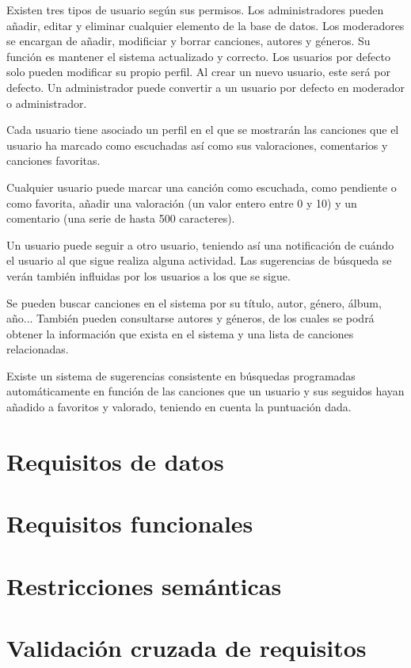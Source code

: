 \documentclass[11pt,a4paper]{article}
\begin{document}
Existen tres tipos de usuario según sus permisos. Los administradores pueden añadir, editar y eliminar cualquier elemento de la base de datos. Los moderadores se encargan de añadir, modificiar y borrar canciones, autores y géneros. Su función es mantener el sistema actualizado y correcto. Los usuarios por defecto solo pueden modificar su propio perfil. Al crear un nuevo usuario, este será por defecto. Un administrador puede convertir a un usuario por defecto en moderador o administrador.

Cada usuario tiene asociado un perfil en el que se mostrarán las canciones que el usuario ha marcado como escuchadas así como sus valoraciones, comentarios y canciones favoritas. 


Cualquier usuario puede marcar una canción como escuchada, como pendiente o como favorita, añadir una valoración (un valor entero entre 0 y 10) y un comentario (una serie de hasta 500 caracteres). 

Un usuario puede seguir a otro usuario, teniendo así una notificación de cuándo el usuario al que sigue realiza alguna actividad. Las sugerencias de búsqueda se verán también influidas por los usuarios a los que se sigue. 



Se pueden buscar canciones en el sistema por su título, autor, género, álbum, año... También pueden consultarse autores y géneros, de los cuales se podrá obtener la información que exista en el sistema y una lista de canciones relacionadas. 

Existe un sistema de sugerencias consistente en búsquedas programadas automáticamente en función de las canciones que un usuario y sus seguidos hayan añadido a favoritos y valorado, teniendo en cuenta la puntuación dada.

\section{Requisitos de datos} %


\section{Requisitos funcionales} %


\section{Restricciones semánticas}


\section{Validación cruzada de requisitos}
\end{document}
